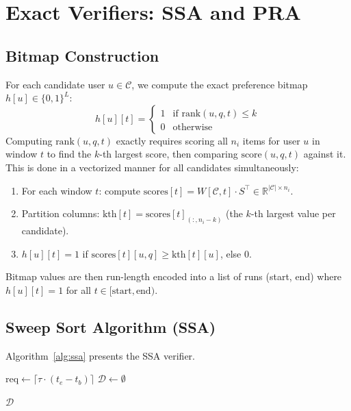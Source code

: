 \section{Exact Verifiers: SSA and PRA}

\subsection{Bitmap Construction}

For each candidate user $u \in \mathcal{C}$, we compute the exact preference bitmap $h[u] \in \{0,1\}^L$:
\[
  h[u][t] = \begin{cases} 1 & \text{if } \text{rank}(u, q, t) \leq k \\ 0 & \text{otherwise} \end{cases}
\]
Computing $\text{rank}(u, q, t)$ exactly requires scoring all $n_i$ items for user $u$ in window $t$ to find the $k$-th largest score, then comparing $\text{score}(u, q, t)$ against it. This is done in a vectorized manner for all candidates simultaneously:
\begin{enumerate}
  \item For each window $t$: compute $\text{scores}[t] = W[\mathcal{C}, t] \cdot S^\top \in \mathbb{R}^{|\mathcal{C}| \times n_i}$.
  \item Partition columns: $\text{kth}[t] = \text{scores}[t]_{(:, n_i - k)}$ (the $k$-th largest value per candidate).
  \item $h[u][t] = 1$ if $\text{scores}[t][u, q] \geq \text{kth}[t][u]$, else 0.
\end{enumerate}

Bitmap values are then run-length encoded into a list of runs (start, end) where $h[u][t] = 1$ for all $t \in [\text{start}, \text{end})$.

\subsection{Sweep Sort Algorithm (SSA)}

Algorithm~\ref{alg:ssa} presents the SSA verifier.

\begin{algorithm}[htbp]
\SetAlgoLined
\KwIn{Run-length encoded bitmap \texttt{runs}$[u]$ for each candidate $u \in \mathcal{C}$; query interval $[t_b, t_e)$; durability $\tau$}
$\text{req} \leftarrow \lceil \tau \cdot (t_e - t_b) \rceil$ 
$\mathcal{D} \leftarrow \emptyset$\;

\Return $\mathcal{D}$
\caption{Sweep Sort Algorithm (SSA) Verifier}
\label{alg:ssa}
\end{algorithm}

